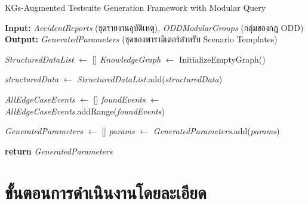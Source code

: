 \begin{algorithm}[H]
\caption{KGs-Augmented Testsuite Generation Framework with Modular Query}
\label{alg:main_framework}
\begin{algorithmic}[1]
\State \textbf{Input:} \textit{AccidentReports} (ชุดรายงานอุบัติเหตุ), \textit{ODDModularGroups} (กลุ่มของกฎ ODD)
\State \textbf{Output:} \textit{GeneratedParameters} (ชุดของพารามิเตอร์สำหรับ Scenario Templates)

    \State \textit{StructuredDataList} $\gets$ []
    \State \textit{KnowledgeGraph} $\gets$ InitializeEmptyGraph()

        \State \textit{structuredData} $\gets$ 
        \State \textit{StructuredDataList}.add(\textit{structuredData})
    \EndFor

        \State {}
    \EndFor

    \State \textit{AllEdgeCaseEvents} $\gets$ []
        \State \textit{foundEvents} $\gets$ 
        \State \textit{AllEdgeCaseEvents}.addRange(\textit{foundEvents})
    \EndFor

    \State \textit{GeneratedParameters} $\gets$ []
        \State \textit{params} $\gets$ 
        \State \textit{GeneratedParameters}.add(\textit{params})
    \EndFor

    \State \textbf{return} \textit{GeneratedParameters}
\EndProcedure
\end{algorithmic}
\end{algorithm}

\section{ขั้นตอนการดำเนินงานโดยละเอียด}\label{sec:ch4_methodology}

